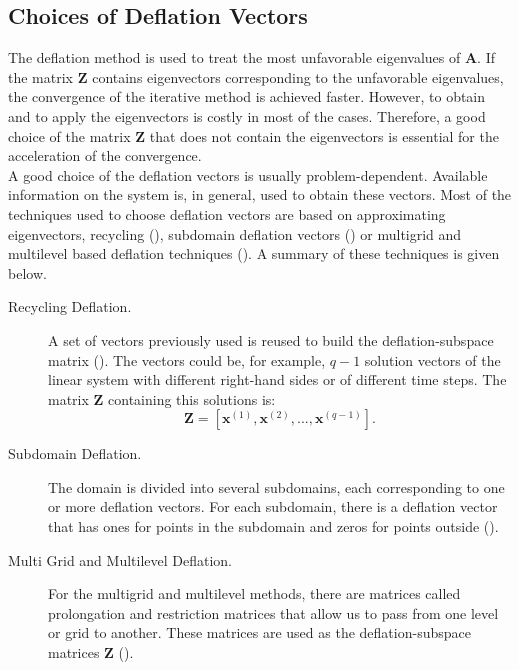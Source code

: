 \documentclass{ecmorXV}
\begin{document}
\subsection{Choices of Deflation Vectors}
\hspace{0.5cm}The deflation method is used to treat the most unfavorable eigenvalues
of $\mathbf{A}$. If the matrix $\mathbf{Z}$ contains eigenvectors corresponding to the unfavorable 
eigenvalues, the convergence of the 
iterative method is achieved faster. However, to obtain and to apply the eigenvectors is costly in most 
of the cases.
Therefore, a good choice of the matrix $\mathbf{Z}$ that does not contain the eigenvectors is essential
for the acceleration of the convergence.\\
A good choice of the deflation vectors is usually problem-dependent. Available information on the system is, in general,
used to obtain these vectors.
Most of the techniques used to choose deflation vectors are based on approximating eigenvectors, 
recycling (\cite{Clemens04}), subdomain deflation vectors (\cite{Vuik02}) or multigrid and 
multilevel based deflation techniques (\cite{Tang09,Smith96}). A summary of these techniques is given below.
\begin{description}
 \item [Recycling Deflation.] A set of vectors previously used is reused to build the deflation-subspace 
 matrix (\cite{Clemens04}). 
The vectors could be, for example, $q-1$
solution vectors of the linear system with different right-hand sides or of different time steps.
The matrix $\mathbf{Z}$ containing this solutions is:
$$\mathbf{Z}=[\mathbf{x}^{(1)},\mathbf{x}^{(2)},...,\mathbf{x}^{(q-1)}].$$
 \item [Subdomain Deflation.] The domain is divided into several subdomains,
 each corresponding to one or more deflation vectors.
For each subdomain, there is a deflation vector that has ones for points in the 
subdomain and zeros for points outside (\cite{Vuik02}).
 \item [Multi Grid and Multilevel Deflation.] For the multigrid and multilevel methods, 
 there are matrices called prolongation and restriction matrices that
allow us to pass from one level or grid to another. 
These matrices are used as the deflation-subspace matrices $\mathbf{Z}$ (\cite{Tang09}).
\end{description}
\end{document}
